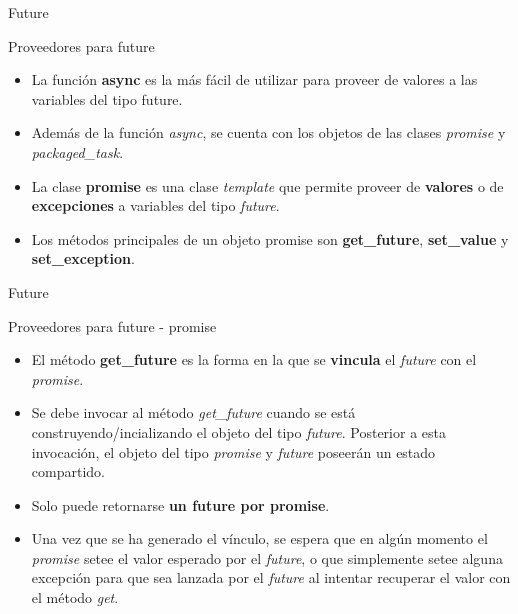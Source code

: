 \begin{frame}{Future}
\begin{block}{Proveedores para future}
\begin{itemize}
  \item La función \textbf{async} es la más fácil de utilizar para proveer de valores a las variables del tipo future.
  \item Además de la función \textit{async}, se cuenta con los objetos de las clases \textit{promise} y \textit{packaged\_task}.
  \item La clase \textbf{promise} es una clase \textit{template} que permite proveer de \textbf{valores} o de \textbf{excepciones} a variables del tipo \textit{future}.
  \item Los métodos principales de un objeto promise son \textbf{get\_future}, \textbf{set\_value} y \textbf{set\_exception}.
\end{itemize}
\end{block}
\end{frame}

\begin{frame}{Future}
\begin{block}{Proveedores para future - promise}
\begin{itemize}
  \item El método \textbf{get\_future} es la forma en la que se \textbf{vincula} el \textit{future} con el \textit{promise}.
  \item Se debe invocar al método \textit{get\_future} cuando se está construyendo/incializando el objeto del tipo \textit{future}. Posterior a esta invocación, el objeto del tipo \textit{promise} y \textit{future} poseerán un estado compartido.
  \item Solo puede retornarse \textbf{un future por promise}.
  \item Una vez que se ha generado el vínculo, se espera que en algún momento el \textit{promise} setee el valor esperado por el \textit{future}, o que simplemente setee alguna excepción para que sea lanzada por el \textit{future} al intentar recuperar el valor con el método \textit{get}.
\end{itemize}
\end{block}
\end{frame}

